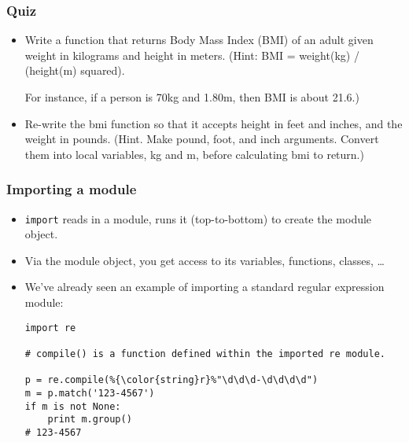 \documentclass{beamer}
\begin{document}
\begin{frame}[fragile]
\frametitle{Quiz}
\begin{itemize}
\item Write a function that returns Body Mass Index
      (BMI)
      of an adult given weight in kilograms and 
      height in meters.
      (Hint: BMI = weight(kg) / (height(m) squared).

      For instance, if a person is 70kg and 1.80m,
      then BMI is about 21.6.)

\item<3-> Re-write
    the bmi function so that it accepts height in feet
    and inches, and the weight in pounds. (Hint. Make pound, foot,
    and inch arguments. Convert them into local
    variables, kg and m, before calculating bmi to return.)
\end{itemize}
\end{frame}

\begin{frame}[fragile]
\frametitle{Importing a module}
\begin{itemize}
\item \lstinline{import} reads in a module, runs
      it (top-to-bottom) to create the module
      object.
\item Via the module object, you get access to its
      variables, functions, classes, \ldots
\item We've already seen an example of importing
      a standard regular expression module:
\begin{lstlisting}[escapechar=\%]
import re 

# compile() is a function defined within the imported re module.

p = re.compile(%{\color{string}r}%"\d\d\d-\d\d\d\d")
m = p.match('123-4567')
if m is not None:
    print m.group()
# 123-4567
\end{lstlisting}
\end{itemize}
\end{frame}
\end{document}
